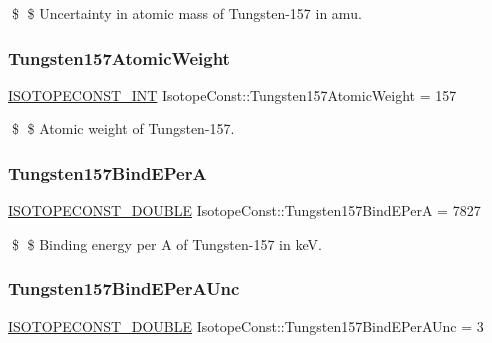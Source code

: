 \$ \$ Uncertainty in atomic mass of Tungsten-\/157 in amu. \mbox{\label{group___isotope_const-_tungsten-_w157_gafbbce65535d81cdf80dcfe4a5425c83f}} 
\subsubsection{\texorpdfstring{Tungsten157\+Atomic\+Weight}{Tungsten157AtomicWeight}}
{\footnotesize\ttfamily \mbox{\hyperlink{group___isotope_const-_macros_ga5f18360b3e99483a35c32d789e62621c}{I\+S\+O\+T\+O\+P\+E\+C\+O\+N\+S\+T\+\_\+\+I\+NT}} Isotope\+Const\+::\+Tungsten157\+Atomic\+Weight = 157}

\$ \$ Atomic weight of Tungsten-\/157. \mbox{\label{group___isotope_const-_tungsten-_w157_gaf4699bfbc6751e6024b624d9a4b2adb1}} 
\subsubsection{\texorpdfstring{Tungsten157\+Bind\+E\+PerA}{Tungsten157BindEPerA}}
{\footnotesize\ttfamily \mbox{\hyperlink{group___isotope_const-_macros_ga8f45a7272ce02c0b4c65c44636ed719a}{I\+S\+O\+T\+O\+P\+E\+C\+O\+N\+S\+T\+\_\+\+D\+O\+U\+B\+LE}} Isotope\+Const\+::\+Tungsten157\+Bind\+E\+PerA = 7827}

\$ \$ Binding energy per A of Tungsten-\/157 in keV. \mbox{\label{group___isotope_const-_tungsten-_w157_gae1f177fb8ba1b62fc45a3bcf6e44ac1d}} 
\subsubsection{\texorpdfstring{Tungsten157\+Bind\+E\+Per\+A\+Unc}{Tungsten157BindEPerAUnc}}
{\footnotesize\ttfamily \mbox{\hyperlink{group___isotope_const-_macros_ga8f45a7272ce02c0b4c65c44636ed719a}{I\+S\+O\+T\+O\+P\+E\+C\+O\+N\+S\+T\+\_\+\+D\+O\+U\+B\+LE}} Isotope\+Const\+::\+Tungsten157\+Bind\+E\+Per\+A\+Unc = 3}

